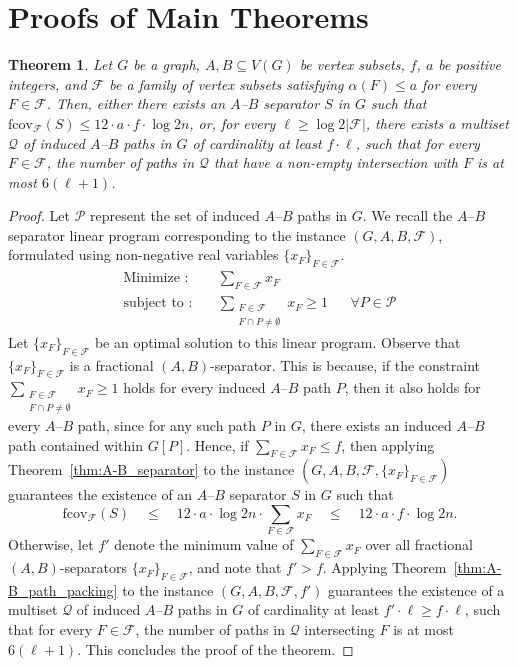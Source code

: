 \documentclass[11pt]{amsart}
\newtheorem{theorem}{Theorem}[section]
\newcommand{\cal}{\mathcal}
\begin{document}
\section{Proofs of Main Theorems}\label{sec:proofOfTheorems}
\begin{theorem}\label{thm:mengers_with_F}
    Let $G$ be a graph, $A, B \subseteq V(G)$ be vertex subsets, $f$, $a$ be positive integers, and ${\cal F}$ be a family of vertex subsets satisfying $\alpha(F)\leq a$ for every $F\in\mathcal{F}$. Then, either there exists an $A$--$B$ separator $S$ in $G$ such that $\mathrm{fcov}_{\mathcal{F}}(S) \leq 12 \cdot a \cdot f \cdot \log 2n$, or, for every $\ell \geq \log 2|\mathcal{F}|$, there exists a multiset $\mathcal{Q}$ of induced $A$--$B$ paths in $G$ of cardinality at least $f \cdot \ell$, such that for every $F \in \mathcal{F}$, the number of paths in $\mathcal{Q}$ that have a non-empty intersection with $F$ is at most $6 (\ell+1)$.
\end{theorem}
\begin{proof}
    Let $\mathcal{P}$ represent the set of induced $A$--$B$ paths in $G$. We recall the $A$--$B$ separator linear program corresponding to the instance $(G, A, B, \mathcal{F})$, formulated using non-negative real variables $\{x_F\}_{F \in \mathcal{F}}$.
    \begin{align*}
        \text{Minimize :}&\quad \sum\limits_{F\in\mathcal{F}} x_{F}\\
        \text{subject to :}&\quad \sum\limits_{\substack{F\in \mathcal{F}\\ F\cap P\neq \emptyset}} x_{F} \geq 1 && \forall P\in \mathcal{P}
    \end{align*}
    Let $\{x_F\}_{F \in \mathcal{F}}$ be an optimal solution to this linear program. Observe that $\{x_F\}_{F \in \mathcal{F}}$ is a fractional $(A, B)$-separator. This is because, if the constraint $\sum\limits_{\substack{F\in \mathcal{F}\\ F\cap P\neq \emptyset}} x_{F} \geq 1$ holds for every induced $A$--$B$ path $P$, then it also holds for every $A$--$B$ path, since for any such path $P$ in $G$, there exists an induced $A$--$B$ path contained within $G[P]$. Hence, if $\sum_{F \in \mathcal{F}} x_F \leq f$, then applying Theorem~\ref{thm:A-B_separator} to the instance $(G, A, B, \mathcal{F}, \{x_F\}_{F \in \mathcal{F}})$ guarantees the existence of an $A$--$B$ separator $S$ in $G$ such that
    $$
    \mathrm{fcov}_{\mathcal{F}}(S) \quad
    \leq \quad 12 \cdot a \cdot \log 2n \cdot \sum_{F \in \mathcal{F}} x_F \quad
    \leq \quad 12 \cdot a \cdot f \cdot \log 2n.
    $$
    Otherwise, let $f'$ denote the minimum value of $\sum_{F \in \mathcal{F}} x_F$ over all fractional $(A, B)$-separators $\{x_F\}_{F \in \mathcal{F}}$, and note that $f' > f$. Applying Theorem~\ref{thm:A-B_path_packing} to the instance $(G, A, B, \mathcal{F}, f')$ guarantees the existence of a multiset $\mathcal{Q}$ of induced $A$--$B$ paths in $G$ of cardinality at least $f' \cdot \ell \geq f \cdot \ell$, such that for every $F \in \mathcal{F}$, the number of paths in $\mathcal{Q}$ intersecting $F$ is at most $6 (\ell+1)$. This concludes the proof of the theorem.
\end{proof}
\end{document}
